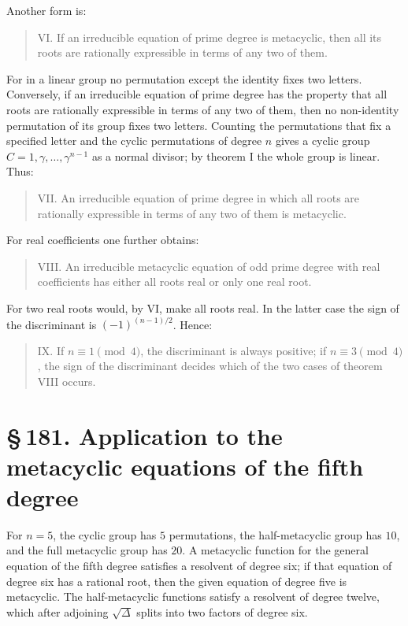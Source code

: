 \documentclass[11pt]{article}
\providecommand{\sect}[2]{\section*{\S\,#1. #2}}
\begin{document}
Another form is:
\begin{quote}
VI. If an irreducible equation of prime degree is metacyclic, then all its roots are rationally expressible in terms of any two of them.
\end{quote}
For in a linear group no permutation except the identity fixes two letters. Conversely, if an irreducible equation of prime degree has the property that all roots are rationally expressible in terms of any two of them, then no non-identity permutation of its group fixes two letters. Counting the permutations that fix a specified letter and the cyclic permutations of degree $n$ gives a cyclic group $C=1,\gamma,\ldots,\gamma^{n-1}$ as a normal divisor; by theorem I the whole group is linear. Thus:
\begin{quote}
VII. An irreducible equation of prime degree in which all roots are rationally expressible in terms of any two of them is metacyclic.
\end{quote}

For real coefficients one further obtains:
\begin{quote}
VIII. An irreducible metacyclic equation of odd prime degree with real coefficients has either all roots real or only one real root.
\end{quote}
For two real roots would, by VI, make all roots real. In the latter case the sign of the discriminant is $(-1)^{(n-1)/2}$. Hence:
\begin{quote}
IX. If $n\equiv1\pmod4$, the discriminant is always positive; if $n\equiv3\pmod4$, the sign of the discriminant decides which of the two cases of theorem VIII occurs.
\end{quote}

\sect{181}{Application to the metacyclic equations of the fifth degree}

For $n=5$, the cyclic group has $5$ permutations, the half-metacyclic group has $10$, and the full metacyclic group has $20$. A metacyclic function for the general equation of the fifth degree satisfies a resolvent of degree six; if that equation of degree six has a rational root, then the given equation of degree five is metacyclic. The half-metacyclic functions satisfy a resolvent of degree twelve, which after adjoining $\sqrt\Delta$ splits into two factors of degree six.
\end{document}
